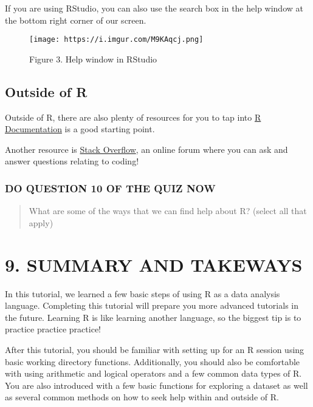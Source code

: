 \documentclass[
]{book}
\begin{document}
If you are using RStudio, you can also use the search box in the help window at the bottom right corner of our screen.

\begin{figure}
\centering
\texttt{[image: https://i.imgur.com/M9KAqcj.png]}
\caption{Figure 3. Help window in RStudio}
\end{figure}

\hypertarget{outside-of-r}{%
\subsection{Outside of R}\label{outside-of-r}}

Outside of R, there are also plenty of resources for you to tap into \href{https://www.rdocumentation.org/}{R Documentation} is a good starting point.

Another resource is \href{https://stackoverflow.com/}{Stack Overflow}, an online forum where you can ask and answer questions relating to coding!

\hypertarget{do-question-10-of-the-quiz-now}{%
\subsubsection{DO QUESTION 10 OF THE QUIZ NOW}\label{do-question-10-of-the-quiz-now}}

\begin{quote}
What are some of the ways that we can find help about R? (select all that apply)
\end{quote}

\hypertarget{summary-and-takeways}{%
\section{9. SUMMARY AND TAKEWAYS}\label{summary-and-takeways}}

In this tutorial, we learned a few basic steps of using R as a data analysis language. Completing this tutorial will prepare you more advanced tutorials in the future. Learning R is like learning another language, so the biggest tip is to practice practice practice!

After this tutorial, you should be familiar with setting up for an R session using basic working directory functions. Additionally, you should also be comfortable with using arithmetic and logical operators and a few common data types of R. You are also introduced with a few basic functions for exploring a dataset as well as several common methods on how to seek help within and outside of R.
\end{document}
